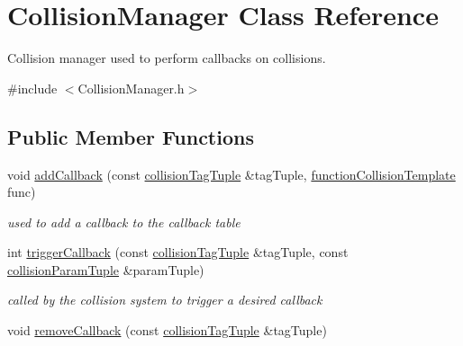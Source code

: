 \hypertarget{class_collision_manager}{\section{Collision\-Manager Class Reference}
\label{df/d14/class_collision_manager}
}


Collision manager used to perform callbacks on collisions.  




{\ttfamily \#include $<$Collision\-Manager.\-h$>$}

\subsection*{Public Member Functions}
\begin{DoxyCompactItemize}
\item 
void \hyperlink{class_collision_manager_ac839e83d753caf39efa2d80efa29d2f4}{add\-Callback} (const \hyperlink{_collision_manager_8h_a59fec3c97983b1c074529cfdd245515a}{collision\-Tag\-Tuple} \&tag\-Tuple, \hyperlink{_collision_manager_8h_a141eae5ec36e58aae61b3cb494451210}{function\-Collision\-Template} func)
\begin{DoxyCompactList}\small\item\em used to add a callback to the callback table \end{DoxyCompactList}\item 
int \hyperlink{class_collision_manager_aaf5aa4a712415540ce7313ec9e96dcef}{trigger\-Callback} (const \hyperlink{_collision_manager_8h_a59fec3c97983b1c074529cfdd245515a}{collision\-Tag\-Tuple} \&tag\-Tuple, const \hyperlink{_collision_manager_8h_aa4e5677732161da0be677d67bec17ea6}{collision\-Param\-Tuple} \&param\-Tuple)
\begin{DoxyCompactList}\small\item\em called by the collision system to trigger a desired callback \end{DoxyCompactList}\item 
\hypertarget{class_collision_manager_a65eb99c8ae19565076c0a3968403b221}{void \hyperlink{class_collision_manager_a65eb99c8ae19565076c0a3968403b221}{remove\-Callback} (const \hyperlink{_collision_manager_8h_a59fec3c97983b1c074529cfdd245515a}{collision\-Tag\-Tuple} \&tag\-Tuple)}\label{df/d14/class_collision_manager_a65eb99c8ae19565076c0a3968403b221}


\end{DoxyCompactItemize}
